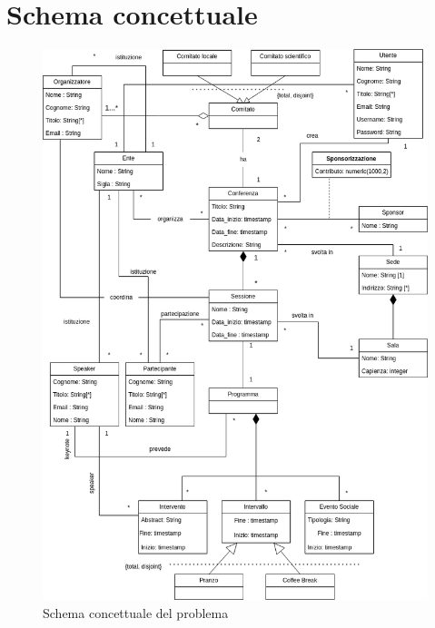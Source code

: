 \section{Schema concettuale}

\begin{figure}[h!]
	\centering
	\includegraphics[scale=0.6]{Immagini/Schema_Concettuale.png}
	\caption{Schema concettuale del problema}\label{uml:schema_concettuale}
\end{figure}
